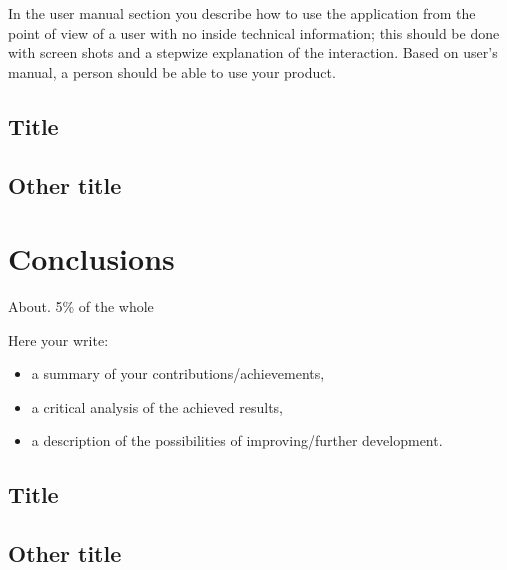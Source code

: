\documentclass[12pt,a4paper,twoside]{report}
\begin{document}
In the user manual section you describe how to use the application from the point of view of a user with no inside technical information; this should be done with screen shots and a stepwize explanation of the interaction. Based on user's manual, a person should be able to use your product.

\section{Title}
\section{Other title}

\chapter{Conclusions}

About. 5\% of the whole

Here your write:
\begin{itemize}
\item a summary of your contributions/achievements,
\item a critical analysis of the achieved results,
\item a description of the possibilities of improving/further development.
\end{itemize}
\section{Title}
\section{Other title}


 


\end{document}
